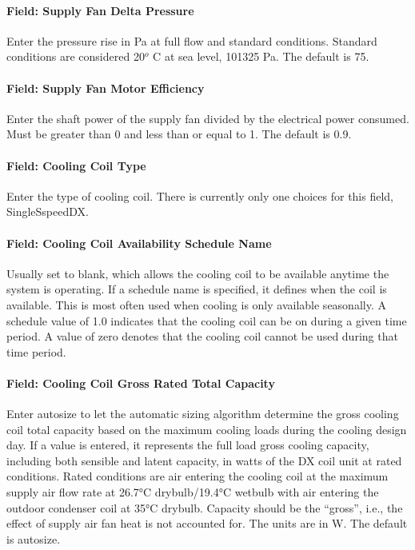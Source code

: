 \paragraph{Field: Supply Fan Delta Pressure}\label{field-supply-fan-delta-pressure-1}

Enter the pressure rise in Pa at full flow and standard conditions. Standard conditions are considered 20\(^{o}\) C at sea level, 101325 Pa. The default is 75.

\paragraph{Field: Supply Fan Motor Efficiency}\label{field-supply-fan-motor-efficiency-2}

Enter the shaft power of the supply fan divided by the electrical power consumed. Must be greater than 0 and less than or equal to 1. The default is 0.9.

\paragraph{Field: Cooling Coil Type}\label{field-cooling-coil-type-2}

Enter the type of cooling coil. There is currently only one choices for this field, SingleSspeedDX.

\paragraph{Field: Cooling Coil Availability Schedule Name}\label{field-cooling-coil-availability-schedule-name-2}

Usually set to blank, which allows the cooling coil to be available anytime the system is operating. If a schedule name is specified, it defines when the coil is available. This is most often used when cooling is only available seasonally. A schedule value of 1.0 indicates that the cooling coil can be on during a given time period. A value of zero denotes that the cooling coil cannot be used during that time period.

\paragraph{Field: Cooling Coil Gross Rated Total Capacity}\label{field-cooling-coil-gross-rated-total-capacity-1}

Enter autosize to let the automatic sizing algorithm determine the gross cooling coil total capacity based on the maximum cooling loads during the cooling design day. If a value is entered, it represents the full load gross cooling capacity, including both sensible and latent capacity, in watts of the DX coil unit at rated conditions. Rated conditions are air entering the cooling coil at the maximum supply air flow rate at 26.7°C drybulb/19.4°C wetbulb with air entering the outdoor condenser coil at 35°C drybulb. Capacity should be the ``gross'', i.e., the effect of supply air fan heat is not accounted for. The units are in W. The default is autosize.

